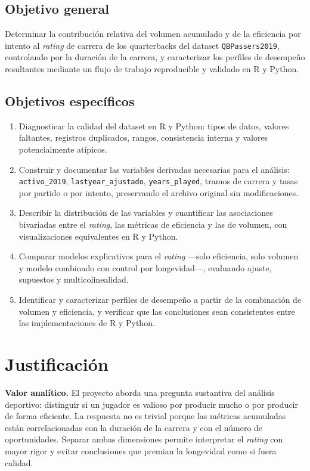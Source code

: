 \documentclass[11pt,a4paper]{article}
\begin{document}
\subsection*{Objetivo general}
Determinar la contribución relativa del volumen acumulado y de la eficiencia por intento al \textit{rating} de carrera de los quarterbacks del dataset \texttt{QBPassers2019}, controlando por la duración de la carrera, y caracterizar los perfiles de desempeño resultantes mediante un flujo de trabajo reproducible y validado en R y Python.

\subsection*{Objetivos específicos}
\begin{enumerate}
  \item Diagnosticar la calidad del dataset en R y Python: tipos de datos, valores faltantes, registros duplicados, rangos, consistencia interna y valores potencialmente atípicos.
  \item Construir y documentar las variables derivadas necesarias para el análisis: \texttt{activo\_2019}, \texttt{lastyear\_ajustado}, \texttt{years\_played}, tramos de carrera y tasas por partido o por intento, preservando el archivo original sin modificaciones.
  \item Describir la distribución de las variables y cuantificar las asociaciones bivariadas entre el \textit{rating}, las métricas de eficiencia y las de volumen, con visualizaciones equivalentes en R y Python.
  \item Comparar modelos explicativos para el \textit{rating} —solo eficiencia, solo volumen y modelo combinado con control por longevidad—, evaluando ajuste, supuestos y multicolinealidad.
  \item Identificar y caracterizar perfiles de desempeño a partir de la combinación de volumen y eficiencia, y verificar que las conclusiones sean consistentes entre las implementaciones de R y Python.
\end{enumerate}

\section{Justificación}
\textbf{Valor analítico.} El proyecto aborda una pregunta sustantiva del análisis deportivo: distinguir si un jugador es valioso por producir mucho o por producir de forma eficiente. La respuesta no es trivial porque las métricas acumuladas están correlacionadas con la duración de la carrera y con el número de oportunidades. Separar ambas dimensiones permite interpretar el \textit{rating} con mayor rigor y evitar conclusiones que premian la longevidad como si fuera calidad.
\end{document}

